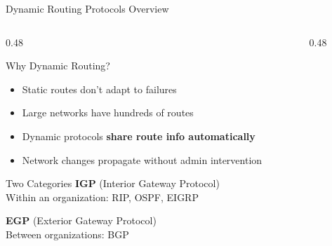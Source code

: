 \documentclass[aspectratio=169]{beamer}  %
\begin{document}
\begin{frame}{Dynamic Routing Protocols Overview}
    \begin{columns}[T]
        \begin{column}{0.48\textwidth}
            \begin{block}{Why Dynamic Routing?}
                \small
                \begin{itemize}\setlength{\itemsep}{2pt}
                    \item Static routes don't adapt to failures
                    \item Large networks have hundreds of routes
                    \item Dynamic protocols \textbf{share route info automatically}
                    \item Network changes propagate without admin intervention
                \end{itemize}
            \end{block}
            
            \vspace{0.2em}
            \begin{alertblock}{Two Categories}
                \small
                \textbf{IGP} (Interior Gateway Protocol) \\
                Within an organization: RIP, OSPF, EIGRP
                
                \vspace{0.2em}
                \textbf{EGP} (Exterior Gateway Protocol) \\
                Between organizations: BGP
            \end{alertblock}
        \end{column}
        \begin{column}{0.48\textwidth}
            \begin{center}
\end{center}
\end{column}
\end{columns}
\end{frame}
\end{document}
